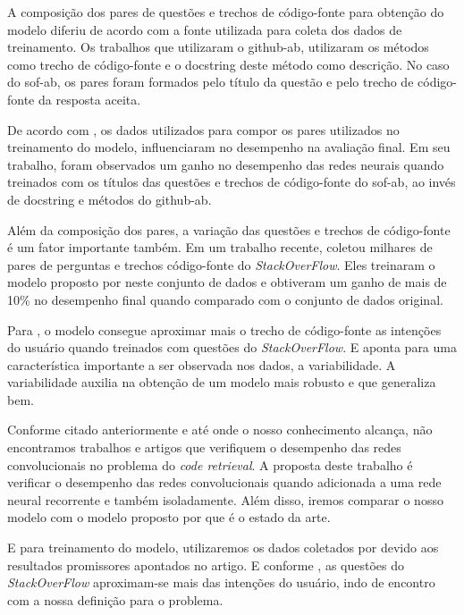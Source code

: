 A composição dos pares de questões e trechos de código-fonte para obtenção do modelo diferiu de acordo com a fonte utilizada para coleta dos dados de treinamento. Os trabalhos que utilizaram o \acrfull{github-ab}, utilizaram os métodos como trecho de código-fonte e o \gls{docstring} deste método como descrição. No caso do \acrfull{sof-ab}, os pares foram formados pelo título da questão e pelo trecho de código-fonte da resposta aceita.

De acordo com \cite{cambronero-deep-learning-code-search:2019}, os dados utilizados para compor os pares utilizados no treinamento do modelo, influenciaram no desempenho na avaliação final. Em seu trabalho, foram observados um ganho no desempenho das redes neurais quando treinados com os títulos das questões e trechos de código-fonte do \acrfull{sof-ab}, ao invés de \gls{docstring} e métodos do \acrfull{github-ab}. 

Além da composição dos pares, a variação das questões e trechos de código-fonte é um fator importante também. Em um trabalho recente, \cite{yao-2018} coletou milhares de pares de perguntas e trechos código-fonte do \textit{StackOverFlow}. Eles treinaram o modelo proposto por \cite{iyer-etal-2016-summarizing} neste conjunto de dados e obtiveram um ganho de mais de 10\% no desempenho final quando comparado com o conjunto de dados original.

Para \cite{cambronero-deep-learning-code-search:2019}, o modelo consegue aproximar mais o trecho de código-fonte as intenções do usuário quando treinados com questões do \textit{StackOverFlow}. E \cite{yao-2018} aponta para uma característica importante a ser observada nos dados, a variabilidade. A variabilidade auxilia na obtenção de um modelo mais robusto e que generaliza bem.

Conforme citado anteriormente e até onde o nosso conhecimento alcança, não encontramos trabalhos e artigos que verifiquem o desempenho das redes convolucionais no problema do \textit{code retrieval}. A proposta deste trabalho é verificar o desempenho das redes convolucionais quando adicionada a uma rede neural recorrente e também isoladamente. Além disso, iremos comparar o nosso modelo com o modelo proposto por \cite{cambronero-deep-learning-code-search:2019} que é o estado da arte.

E para treinamento do modelo, utilizaremos os dados coletados por \cite{yao-2018} devido aos resultados promissores apontados no artigo. E conforme \cite{cambronero-deep-learning-code-search:2019}, as questões do \textit{StackOverFlow} aproximam-se mais das intenções do usuário, indo de encontro com a nossa definição para o problema.